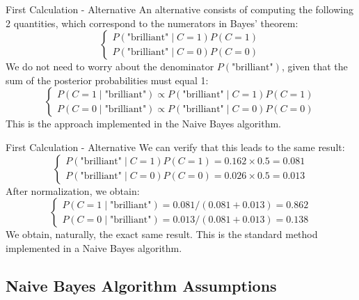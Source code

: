 \begin{frame}{First Calculation - Alternative}
	An alternative consists of computing the following 2 quantities, which correspond to the numerators in Bayes' theorem:
	\begin{equation}
		\begin{cases}
			P(\text{"brilliant"} \mid C = 1) P(C=1) \\
			P(\text{"brilliant"} \mid C = 0) P(C=0)
		\end{cases}
		\nonumber
	\end{equation}
	\pause
	We do not need to worry about the denominator $P(\text{"brilliant"})$, given that the sum of the posterior probabilities must equal 1:
	\begin{equation}
		\begin{cases}
			P(C = 1 \mid \text{"brilliant"}) \propto P(\text{"brilliant"} \mid C = 1) P(C=1) \\
			P(C = 0 \mid \text{"brilliant"}) \propto P(\text{"brilliant"} \mid C = 0) P(C=0)
		\end{cases}
		\nonumber
	\end{equation}
	This is the approach implemented in the Naive Bayes algorithm.
\end{frame}

\begin{frame}{First Calculation - Alternative}
	We can verify that this leads to the same result:
	\begin{equation}
		\begin{cases}
			P(\text{"brilliant"} \mid C = 1) P(C=1) = 0.162 \times 0.5 = 0.081 \\
			P(\text{"brilliant"} \mid C = 0) P(C=0) = 0.026 \times 0.5 = 0.013
		\end{cases}
		\nonumber
	\end{equation}	
	After normalization, we obtain:
	\begin{equation}
		\begin{cases}
			P(C = 1 \mid \text{"brilliant"}) = 0.081 / (0.081 + 0.013) =  0.862 \\
			P(C = 0 \mid \text{"brilliant"}) = 0.013 / (0.081 + 0.013) =  0.138
		\end{cases}
		\nonumber
	\end{equation}
	We obtain, naturally, the exact same result. This is the standard method implemented in a Naive Bayes algorithm.
\end{frame}

\subsection[Naive Bayes Algorithm Assumptions]{Naive Bayes Algorithm Assumptions}

